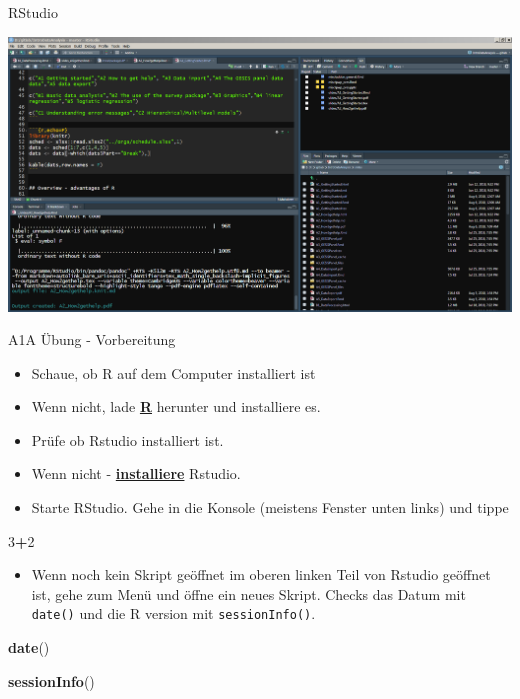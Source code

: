 \documentclass[ignorenonframetext,]{beamer}
\newenvironment{Shaded}{\begin{snugshade}}{\end{snugshade}}
\newcommand{\KeywordTok}[1]{\textcolor[rgb]{0.13,0.29,0.53}{\textbf{#1}}}
\newcommand{\DecValTok}[1]{\textcolor[rgb]{0.00,0.00,0.81}{#1}}
\newcommand{\OperatorTok}[1]{\textcolor[rgb]{0.81,0.36,0.00}{\textbf{#1}}}
\newcommand{\NormalTok}[1]{#1}
\providecommand{\tightlist}{%
  \setlength{\itemsep}{0pt}\setlength{\parskip}{0pt}}
\begin{document}
\begin{frame}{RStudio}

\includegraphics{figure/RstudioExample.PNG}

\end{frame}

\begin{frame}[fragile]{A1A Übung - Vorbereitung}

\begin{itemize}
\tightlist
\item
  Schaue, ob R auf dem Computer installiert ist
\item
  Wenn nicht, lade \href{r-project.org}{\textbf{R}} herunter und
  installiere es.
\item
  Prüfe ob Rstudio installiert ist.
\item
  Wenn nicht - \href{http://www.rstudio.com/}{\textbf{installiere}}
  Rstudio.
\item
  Starte RStudio. Gehe in die Konsole (meistens Fenster unten links) und
  tippe
\end{itemize}

\begin{Shaded}
\begin{Highlighting}[]
\DecValTok{3}\OperatorTok{+}\DecValTok{2}
\end{Highlighting}
\end{Shaded}

\begin{itemize}
\tightlist
\item
  Wenn noch kein Skript geöffnet im oberen linken Teil von Rstudio
  geöffnet ist, gehe zum Menü und öffne ein neues Skript. Checks das
  Datum mit \texttt{date()} und die R version mit
  \texttt{sessionInfo()}.
\end{itemize}

\begin{Shaded}
\begin{Highlighting}[]
\KeywordTok{date}\NormalTok{()}
\end{Highlighting}
\end{Shaded}

\begin{Shaded}
\begin{Highlighting}[]
\KeywordTok{sessionInfo}\NormalTok{()}
\end{Highlighting}
\end{Shaded}

\end{frame}
\end{document}
